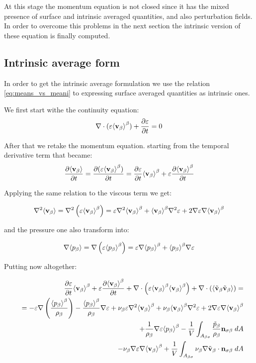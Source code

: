 At this stage the momentum equation is not closed since it has the mixed presence of surface and intrinsic averaged quantities, and also perturbation fields.
In order to overcome this problems in the next section the intrinsic version of these equation is finally computed. 

\subsection{Intrinsic average form}

In order to get the intrinsic average formulation we use the relation \eqref{eq:means_vs_meani} to expressing surface averaged quantities as intrinsic ones.

We first start withe the continuity equation:
$$
\nabla \cdot (\varepsilon{\left< \textbf{v}_{\beta}\right>}^{\beta} ) + \dfrac{\partial \varepsilon}{\partial t}= 0
$$

After that we retake the momentum equation. starting from the temporal derivative term that became:
$$
\dfrac{\partial {\left< \textbf{v}_{\beta}\right>}}{\partial t} = \dfrac{\partial (\varepsilon{\left< \textbf{v}_{\beta}\right>}^{\beta})}{\partial t} = \dfrac{\partial \varepsilon}{\partial t}{\left< \textbf{v}_{\beta} \right>}^{\beta} + \varepsilon \dfrac{\partial {\left< \textbf{v}_{\beta}\right>}^{\beta}}{\partial t}
$$

Applying the same relation to the viscous term we get:

\begin{equation}
	\nabla^2 {\left< \textbf{v}_{\beta} \right>} = \nabla^2 \left( \varepsilon {\left< \textbf{v}_{\beta}\right>}^{\beta} \right) = \varepsilon \nabla^2 {\left< \textbf{v}_{\beta} \right>}^{\beta} + {\left< \textbf{v}_{\beta} \right>}^{\beta} \nabla^2 \varepsilon +2 \nabla \varepsilon \nabla {\left< \textbf{v}_{\beta}\right>}^{\beta}
\end{equation}

and the pressure one also transform into:

\begin{equation}
\nabla {\left< p_{\beta}\right>} = \nabla \left( \varepsilon {\left< p_{\beta}\right>}^{\beta} \right) = \varepsilon \nabla {\left< p_{\beta}\right>}^{\beta} + {\left< p_{\beta} \right>}^{\beta} \nabla \varepsilon
\end{equation}

Putting now altogether:

\begin{eqnarray}
&& \dfrac{\partial \varepsilon}{\partial t}{\left< \textbf{v}_{\beta} \right>}^{\beta} + \varepsilon \dfrac{\partial {\left< \textbf{v}_{\beta}\right>}^{\beta}}{\partial t} + \nabla \cdot \left(\varepsilon {\left< \textbf{v}_{\beta}\right>}^{\beta}{\left< \textbf{v}_{\beta} \right>}^{\beta}\right)   + \nabla \cdot \left({\left< \tilde{\textbf{v}}_{\beta} \tilde{\textbf{v}}_{\beta} \right>}\right) = \nonumber \\
&&= -\varepsilon \nabla \left(\dfrac{{\left< p_{\beta} \right>}^{\beta}}{\rho_{\beta}}\right) - \dfrac{{\left< p_{\beta} \right>}^{\beta}}{\rho_{\beta}} \nabla \varepsilon + \nu_{\beta} \varepsilon \nabla^2 {\left< \textbf{v}_{\beta} \right>}^{\beta} + \nu_{\beta} {\left< \textbf{v}_{\beta} \right>}^{\beta} \nabla^2 \varepsilon + 2 \nabla \varepsilon \nabla {\left< \textbf{v}_{\beta}\right>}^{\beta} \nonumber \\
&&+\dfrac{1}{\rho_{\beta}}\nabla\varepsilon {\left< p_{\beta}\right>}^{\beta} - \dfrac{1}{V} \int_{A_{\beta \sigma}} \dfrac{\tilde{p}_{\beta}}{\rho_{\beta}} \mathbf{n}_{\sigma \beta} \;dA \nonumber \\
&&- \nu_{\beta} \nabla \varepsilon \nabla {\left< \textbf{v}_{\beta}\right>}^{\beta} + \dfrac{1}{V} \int_{A_{\beta \sigma}} \nu_{\beta} \nabla \tilde{\textbf{v}}_{\beta} \cdot \mathbf{n}_{\sigma \beta} \;dA
\end{eqnarray}

